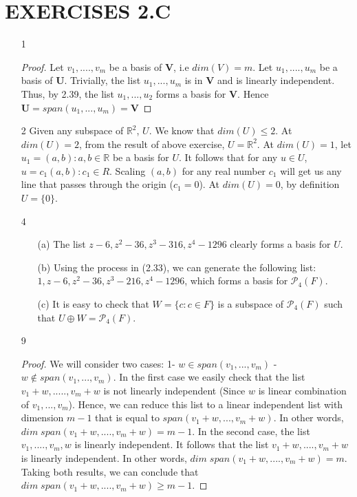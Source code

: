 \documentclass{article}
\begin{document}
\section*{EXERCISES 2.C}
\begin{enumerate}
\item[1]
\begin{proof}
Let $v_1,....,v_m$ be a basis of $\bm{V}$, i.e $dim(V)=m$. Let $u_1,....,u_m$ be a basis of $\bm{U}$. Trivially, the list $u_1,...,u_m$ is in $\bm{V}$ and is linearly independent. Thus, by 2.39, the list $u_1,...,u_2$ forms a basis for $\bm{V}$. Hence $\bm{U} = span(u_1,...,u_m) = \bm{V}$
\end{proof}
\item[2]
Given any subspace of $\mathbb{R}^2$, $U$. We know that $dim(U) \leq 2$. At $dim(U) = 2$, from the result of above exercise, $U = \mathbb{R}^2$. At $dim(U) = 1$, let $u_1 = (a,b): a,b \in \mathbb{R}$ be a basis for $U$. It follows that for any $u \in U$, $u = c_1(a,b): c_1 \in R$. Scaling $(a,b)$ for any real number $c_1$ will get us any line that passes through the origin ($c_1 = 0$). At $dim(U) = 0$, by definition $U = \{ 0 \}$.
\item[4]
\begin{enumerate}
\item[(a)] The list $z-6, z^2-36, z^3-316,z^4-1296$ clearly forms a basis for $U$.
\item[(b)] Using the process in (2.33), we can generate the following list: $1,z-6,z^2-36,z^3-216, z^4-1296$, which forms a basis for $\mathcal{P}_4(F)$.
\item[(c)] It is easy to check that $W = \{c:c \in F \}$ is a subspace of $\mathcal{P}_4(F)$ such that $U \oplus W = \mathcal{P}_4(F)$.
\end{enumerate}
\item[9]
\begin{proof}
We will consider two cases: 1- $w \in span(v_1,...,v_m)$ - $w \not \in span(v_1,...,v_m)$. In the first case we easily check that the list $v_1 + w,.....,v_m + w$ is not linearly independent (Since $w$ is linear combination of $v_1,...,v_m$). Hence, we can reduce this list to a linear independent list with dimension $m-1$ that is equal to $span(v_1+w,...,v_m +w)$. In other words, $dim\; span(v_1+w,....,v_m+w) = m-1$. In the second case, the list $v_1,....,v_m,w$ is linearly independent. It follows that the list $v_1+w,....,v_m+w$ is linearly independent. In other words, $dim\; span(v_1+w,....,v_m+w) = m$. Taking both results, we can conclude that $dim\; span(v_1+w,....,v_m+w) \geq m-1$.

\end{proof}
\end{enumerate}
\end{document}
